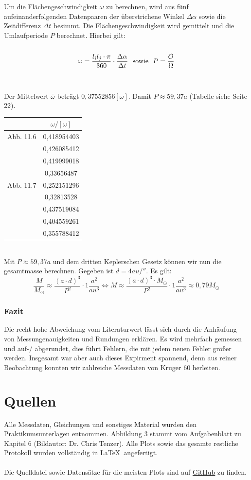 \documentclass[12pt]{article}
\begin{document}
Um die Flächengeschwindigkeit $\omega$ zu berechnen, wird aus fünf aufeinanderfolgenden Datenpaaren der
überstrichene Winkel $\Delta \alpha$ sowie die Zeitdifferenz $\Delta t$ besimmt. Die Flächengeschwindigkeit wird gemittelt und die
Umlaufperiode $P$ berechnet. Hierbei gilt:\\\\
\[\omega=\frac{l_i l_j \cdot \pi}{360}\cdot \frac{\Delta \alpha}{\Delta t} \ \ \textnormal{sowie} \ \ P=\frac{O}{\Omega}\]\\\\
Der Mittelwert $\overline{\omega}$ beträgt $0,37552856[\omega]$. Damit $P \approx 59,37a$ (Tabelle siehe Seite 22).
\newpage\noindent\begin{table}[!ht]
    \centering
    \begin{tabular}{c|c}
        ~ & $\omega / [\omega]$  \\\hline
        Abb. 11.6 & 0,418954403  \\
        ~ & 0,426085412  \\ 
        ~ & 0,419999018  \\ 
        ~ & 0,33656487 \\ \hline
        Abb. 11.7 & 0,252151296  \\ 
        ~ & 0,32813528   \\ 
        ~ & 0,437519084  \\ 
        ~ & 0,404559261  \\ 
        ~ & 0,355788412  \\ 
    \end{tabular}
\end{table}\\
Mit $P\approx 59,37a$ und dem dritten Keplerschen Gesetz können wir nun die gesamtmasse berechnen. Gegeben ist $d=4au/''$. Es gilt:
\[\frac{M}{M_\odot} \approx \frac{(a\cdot d)^3}{P^2} \cdot 1 \frac{a^2}{au^3} \Leftrightarrow M \approx \frac{(a\cdot d)^3 \cdot M_\odot}{P^2} \cdot 1 \frac{a^2}{au^3} \approx 0,79 M_\odot \]
\subsubsection*{Fazit}
Die recht hohe Abweichung vom Literaturwert lässt sich durch die Anhäufung von Messungenauigkeiten und Rundungen erklären. Es wird mehrfach gemessen und auf-/ abgerundet, dies führt Fehlern, die mit jedem neuen Fehler größer werden. Insgesamt war aber auch dieses Expirment spannend, denn aus reiner Beobachtung konnten wir zahlreiche Messdaten von Kruger 60 herleiten.
\newpage\noindent
\section{Quellen}
Alle Messdaten, Gleichungen und sonstiges Material wurden den Praktikumsunterlagen entnommen. Abbildung 3 stammt vom Aufgabenblatt zu Kapitel 6 (Bildautor: Dr. Chris Tenzer). Alle Plots sowie das gesamte restliche Protokoll wurden vollständig in \LaTeX \ angefertigt.\\\\
Die Quelldatei sowie Datensätze für die meisten Plots sind auf \href{https://github.com/Flog7877/Astronomisches-Praktikum}{GitHub} zu finden. 
\end{document}
